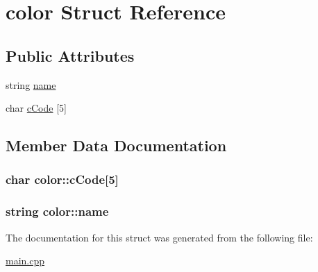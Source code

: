 \hypertarget{structcolor}{\section{color Struct Reference}
\label{structcolor}
}
\subsection*{Public Attributes}
\begin{DoxyCompactItemize}
\item 
string \hyperlink{structcolor_a13fa946ded92e6336cb924ca1bae61c4}{name}
\item 
char \hyperlink{structcolor_aa8bb9eddf54d131ed271efd7094fca0b}{c\-Code} \mbox{[}5\mbox{]}
\end{DoxyCompactItemize}


\subsection{Member Data Documentation}
\hypertarget{structcolor_aa8bb9eddf54d131ed271efd7094fca0b}{
\subsubsection[{c\-Code}]{\setlength{\rightskip}{0pt plus 5cm}char color\-::c\-Code\mbox{[}5\mbox{]}}}\label{structcolor_aa8bb9eddf54d131ed271efd7094fca0b}
\hypertarget{structcolor_a13fa946ded92e6336cb924ca1bae61c4}{
\subsubsection[{name}]{\setlength{\rightskip}{0pt plus 5cm}string color\-::name}}\label{structcolor_a13fa946ded92e6336cb924ca1bae61c4}


The documentation for this struct was generated from the following file\-:\begin{DoxyCompactItemize}
\item 
\hyperlink{main_8cpp}{main.\-cpp}\end{DoxyCompactItemize}
